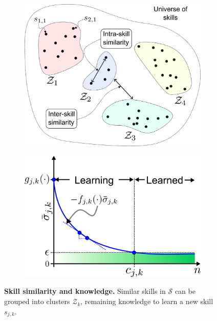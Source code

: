 \documentclass[12pt]{article}
\begin{document}
\begin{figure}[!t]
	\centering
	\hspace*{\fill}
	\begin{subfigure}[t]{0.45\textwidth}
		\subcaption{}
		\includegraphics[width= \textwidth]{skill_similarity.png} \label{fig:skill_similarity}
	\end{subfigure}
	\hfill
	\begin{subfigure}[t]{0.48\textwidth}
		\subcaption{}
		\includegraphics[width=\textwidth]{knowledge_idealization.png} \label{fig:knowledge_idealization}
	\end{subfigure}
	\hspace*{\fill}
	\caption[] {\label{fig:experimental_results} \textbf{Skill similarity and knowledge.}  Similar skills in $\mathcal{S}$ can be grouped into clusters $\mathcal{Z}_k$,  remaining knowledge to learn a new skill $s_{j,k}$.}	
\end{figure}
\end{document}
